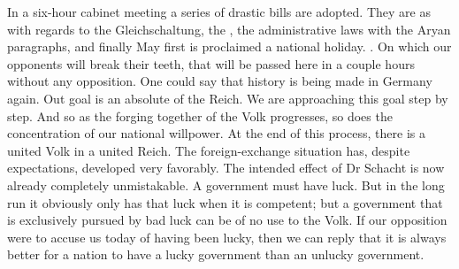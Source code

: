 In a six-hour cabinet meeting a series of drastic bills are adopted. They are as with regards to the Gleichschaltung, the , the administrative laws with the Aryan paragraphs, and finally May first is proclaimed a national holiday. . On which our opponents will break their teeth, that will be passed here in a couple hours without any opposition. One could say that history is being made in Germany again. Out goal is an absolute  of the Reich. We are approaching this goal step by step. And so as the forging together of the Volk progresses, so does the concentration of our national willpower. At the end of this process, there is a united Volk in a united Reich. The foreign-exchange situation has, despite expectations, developed very favorably. The intended effect of Dr Schacht is now already completely unmistakable. A government must have luck. But in the long run it obviously only has that luck when it is competent; but a government that is exclusively pursued by bad luck can be of no use to the Volk. If our opposition were to accuse us today of having been lucky, then we can reply that it is always better for a nation to have a lucky government than an unlucky government.

